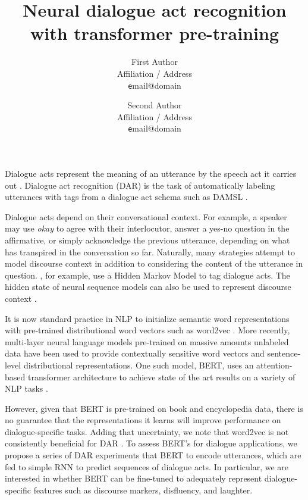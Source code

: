 \documentclass[11pt,a4paper,headings=standardclasses]{scrartcl}
\title{Neural dialogue act recognition with transformer pre-training} %
\author{
  First Author \\
  Affiliation / Address \\
  {\texttt email@domain} \\\and
  Second Author \\
  Affiliation / Address \\
  {\texttt email@domain} \\
}
\date{}
\begin{document}
\maketitle

Dialogue acts represent the meaning of an utterance by the speech act it carries out \citep{austinHowThingsWords2009}.
Dialogue act recognition (DAR) is the task of automatically labeling utterances with tags from a dialogue act schema such as DAMSL \citep{coreCodingDialogsDAMSL1997}.

Dialogue acts depend on their conversational context.
For example, a speaker may use \textit{okay} to agree with their interlocutor, answer a yes-no question in the affirmative, 
or simply acknowledge the previous utterance, depending on what has transpired in the conversation so far.
Naturally, many strategies attempt to model discourse context in addition to considering the content of the utterance in question.
\cite{stolckeDialogueActModeling2000}, for example, use a Hidden Markov Model to tag dialogue acts.
The hidden state of neural sequence models can also be used to represent discourse context 
\citep[e.g.][]{kalchbrennerRecurrentConvolutionalNeural2013,tranPreservingDistributionalInformation2017}.


It is now standard practice in NLP to initialize semantic word representations
with pre-trained distributional word vectors such as word2vec \citep{mikolov2013distributed}.
More recently, multi-layer neural language models pre-trained on massive amounts unlabeled data
have been used to provide contextually sensitive word vectors and sentence-level distributional representations.
One such model, BERT, uses an attention-based transformer architecture to achieve state of the art results
on a variety of NLP tasks \citep{devlinBERTPretrainingDeep2018}.

However, given that BERT is pre-trained on book and encyclopedia data, 
there is no guarantee that the representations it learns will improve performance on dialogue-specific tasks.
Adding that uncertainty, we note that word2vec is not consistently beneficial for DAR \citep{cerisaraEffectsUsingWord2vec2017}.
To assess BERT's for dialogue applications, we propose a series of DAR experiments that BERT to encode utterances, 
which are fed to simple RNN to predict sequences of dialogue acts.
In particular, we are interested in whether BERT can be fine-tuned to adequately represent
dialogue-specific features such as discourse markers, disfluency, and laughter.
\end{document}
